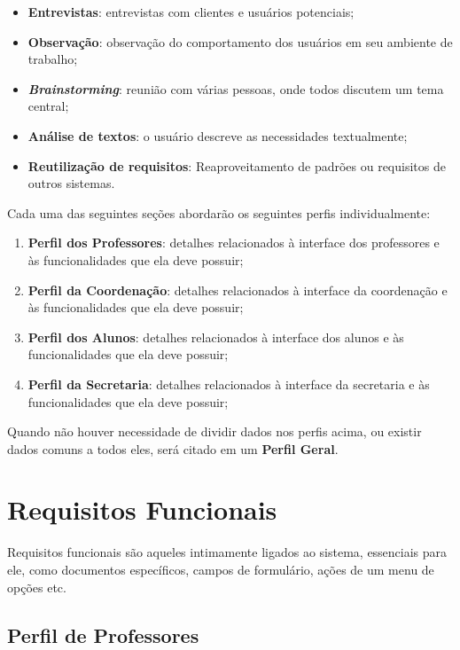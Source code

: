 \documentclass{book}
\begin{document}
 
\begin{itemize}
	\item \textbf{Entrevistas}: entrevistas com clientes e usuários potenciais;
	\item \textbf{Observação}: observação do comportamento dos usuários em seu ambiente de trabalho;
	\item \textbf{\textit{Brainstorming}}: reunião com várias pessoas, onde todos discutem um tema central;
	\item \textbf{Análise de textos}: o usuário descreve as necessidades textualmente;
	\item \textbf{Reutilização de requisitos}: Reaproveitamento de padrões ou requisitos de outros sistemas. 
\end{itemize}


Cada uma das seguintes seções abordarão os seguintes perfis individualmente:

\begin{enumerate}
	\item \textbf{Perfil dos Professores}: detalhes relacionados à interface dos professores e às funcionalidades
	que ela deve possuir;
	\item \textbf{Perfil da Coordenação}: detalhes relacionados à interface da coordenação e às funcionalidades
	que ela deve possuir;
	\item \textbf{Perfil dos Alunos}: detalhes relacionados à interface dos alunos e às funcionalidades
	que ela deve possuir;
	\item \textbf{Perfil da Secretaria}: detalhes relacionados à interface da secretaria e às funcionalidades
	que ela deve possuir;
\end{enumerate}


Quando não houver necessidade de dividir dados nos perfis acima, ou existir dados comuns a todos eles, será citado
em um \textbf{Perfil Geral}.


\section{Requisitos Funcionais}

Requisitos funcionais são aqueles intimamente ligados ao sistema, essenciais para ele, como documentos
específicos, campos de formulário, ações de um menu de opções etc.

\subsection{Perfil de Professores}
\end{document}
